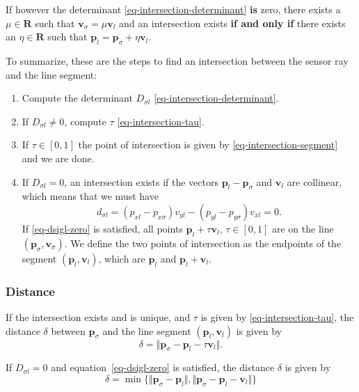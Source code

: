 \documentclass[11pt]{article}
\newcommand{\Dsigl}{D_{\sigma l}}
\newcommand{\dsigl}{d_{\sigma l}}
\newcommand{\pbl}{\mathbf{p}_l}
\newcommand{\pbsig}{\mathbf{p}_\sigma}
\newcommand{\pxl}{p_{xl}}
\newcommand{\pyl}{p_{yl}}
\newcommand{\pxsig}{p_{x\sigma}}
\newcommand{\pysig}{p_{y\sigma}}
\newcommand{\Rb}{\mathbf{R}}
\newcommand{\vbl}{\mathbf{v}_l}
\newcommand{\vxl}{v_{xl}}
\newcommand{\vyl}{v_{yl}}
\newcommand{\vbsig}{\mathbf{v}_\sigma}
\begin{document}
If however the determinant \eqref{eq-intersection-determinant} \textbf{is}
zero, there exists a $\mu\in\Rb$ such that $\vbsig=\mu\vbl$ and an
intersection exists \textbf{if and only if} there exists an $\eta\in\Rb$ such
that $\pbl = \pbsig + \eta\vbl$.

To summarize, these are the steps to find an intersection between the sensor
ray and the line segment:
\begin{enumerate}
    \item Compute the determinant $\Dsigl$ \eqref{eq-intersection-determinant}.
    \item If $\Dsigl\neq 0$, compute $\tau$ \eqref{eq-intersection-tau}.
    \item If $\tau\in[0,1]$ the point of intersection is given by
        \eqref{eq-intersection-segment} and we are done.
    \item If $\Dsigl=0$, an intersection exists if the vectors $\pbl-\pbsig$
        and $\vbl$ are collinear, which means that we must have
        \begin{equation}
            \dsigl=(\pxl-\pxsig)\vyl - (\pyl - \pysig)\vxl=0.
            \label{eq-dsigl-zero}
        \end{equation}
        If \eqref{eq-dsigl-zero} is satisfied, all points
        $\pbl+\tau\vbl,\,\tau\in[0,1]$ are on the line $(\pbsig,\vbsig)$. We
        define the two points of intersection as the endpoints of the segment
        $(\pbl,\vbl)$, which are $\pbl$ and $\pbl + \vbl$.
\end{enumerate}

\subsubsection*{Distance}
If the intersection exists and is unique, and $\tau$ is given by
\eqref{eq-intersection-tau}, the distance $\delta$ between $\pbsig$ and the
line segment $(\pbl, \vbl)$ is given by
\begin{equation}
    \delta = \Vert \pbsig - \pbl - \tau\vbl\Vert.
    \label{eq-distance-line-segment-unique}
\end{equation}

If $\Dsigl=0$ and equation~\eqref{eq-dsigl-zero} is satisfied, the distance
$\delta$ is given by
\begin{equation}
    \delta = \min\{\Vert\pbsig-\pbl\Vert, \Vert\pbsig-\pbl-\vbl\Vert\}
    \label{eq-distance-line-segment-collinear}
\end{equation}
\end{document}
